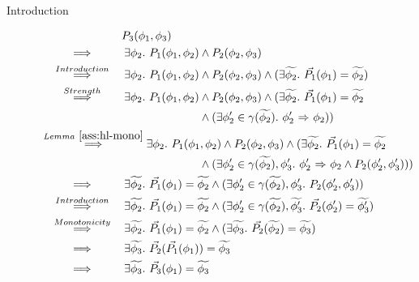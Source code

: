 \begin{proofatend}~
    \begin{description}
        \item[Introduction]
        \begin{align*}
        & \phantom{\overset{}{~\quad\quad\implies\quad\quad~}}~
        P_3(\phi_1, \phi_3)\\
        & \overset{}{~\quad\quad\implies\quad\quad~} 
        \exists \phi_2.~ P_1(\phi_1, \phi_2) \wedge P_2(\phi_2, \phi_3)\\
        & \overset{Introduction}{~\quad\quad\implies\quad\quad~} 
        \exists \phi_2.~ P_1(\phi_1, \phi_2) \wedge P_2(\phi_2, \phi_3)
        \wedge (\exists \grad{\phi_2}.~ \dgrad{P_1}(\phi_1) = \grad{\phi_2})\\
        & \overset{Strength}{~\quad\quad\implies\quad\quad~} 
        \exists \phi_2.~ P_1(\phi_1, \phi_2) \wedge P_2(\phi_2, \phi_3)
        \wedge (\exists \grad{\phi_2}.~ \dgrad{P_1}(\phi_1) = \grad{\phi_2} \\
        & \quad\quad\quad\quad\quad\quad\quad\quad\quad\quad\quad\quad\quad\quad
        \wedge 
        (\exists \phi_2' \in \gamma(\grad{\phi_2}).~ \phiImplies{\phi_2'}{\phi_2}))\\
        & \overset{Lemma~\ref{ass:hl-mono}}{~\quad\quad\implies\quad\quad~} 
        \exists \phi_2.~ P_1(\phi_1, \phi_2) \wedge P_2(\phi_2, \phi_3)
        \wedge (\exists \grad{\phi_2}.~ \dgrad{P_1}(\phi_1) = \grad{\phi_2} \\
        & \quad\quad\quad\quad\quad\quad\quad\quad\quad\quad\quad\quad\quad\quad
        \wedge 
        (\exists \phi_2' \in \gamma(\grad{\phi_2}), \phi_3'.~ \phiImplies{\phi_2'}{\phi_2} \wedge P_2(\phi_2', \phi_3')))\\
        & \overset{}{~\quad\quad\implies\quad\quad~} 
        \exists \grad{\phi_2}.~ \dgrad{P_1}(\phi_1) = \grad{\phi_2} \wedge 
        (\exists \phi_2' \in \gamma(\grad{\phi_2}), \phi_3'.~ P_2(\phi_2', \phi_3'))\\
        & \overset{Introduction}{~\quad\quad\implies\quad\quad~} 
        \exists \grad{\phi_2}.~ \dgrad{P_1}(\phi_1) = \grad{\phi_2} \wedge 
        (\exists \phi_2' \in \gamma(\grad{\phi_2}), \grad{\phi_3'}.~ \dgrad{P_2}(\phi_2') = \grad{\phi_3'})\\
        & \overset{Monotonicity}{~\quad\quad\implies\quad\quad~} 
        \exists \grad{\phi_2}.~ \dgrad{P_1}(\phi_1) = \grad{\phi_2} \wedge 
        (\exists \grad{\phi_3}.~ \dgrad{P_2}(\grad{\phi_2}) = \grad{\phi_3})\\
        & \overset{}{~\quad\quad\implies\quad\quad~} 
        \exists \grad{\phi_3}.~ \dgrad{P_2}(\dgrad{P_1}(\phi_1)) = \grad{\phi_3}\\
        & \overset{}{~\quad\quad\implies\quad\quad~} 
        \exists \grad{\phi_3}.~ \dgrad{P_3}(\phi_1) = \grad{\phi_3}
        \end{align*}
        

\end{description}
\end{proofatend}
